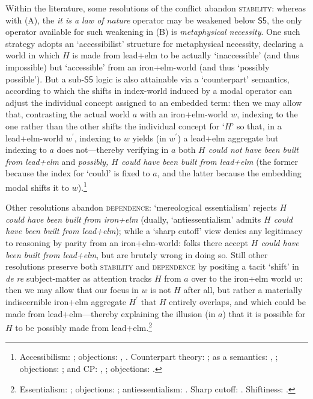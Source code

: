 \documentclass[12pt]{article}
\begin{document}
Within the literature, some resolutions of the conflict abandon
\textsc{stability}: whereas with (A), the \emph{it is a law of nature}
operator may be weakened below $\mathsf{S5}$, the only operator available for
such weakening in (B) is \emph{metaphysical necessity}. One such strategy
adopts an `accessibilist' structure for metaphysical necessity, declaring a
world in which $H$ is made from lead+elm to be actually `inaccessible' (and
thus impossible) but `accessible' from an iron+elm-world (and thus `possibly
possible'). But a sub-$\mathsf{S5}$ logic is also attainable via a
`counterpart' semantics, according to which the shifts in index-world induced
by a modal operator can adjust the individual concept assigned to an embedded
term: then we may allow that, contrasting the actual world $a$ with an
iron+elm-world $w$, indexing to the one rather than the other shifts the
individual concept for `$H$' so that, in a lead+elm-world $w^{\prime}$,
indexing to $w$ yields (in $w^{\prime}$) a lead+elm aggregate but indexing to
$a$ does not---thereby verifying in $a$ both \emph{$H$ could not have been
built from lead+elm} and \emph{possibly, $H$ could have been built from
lead+elm} (the former because the index for `could' is fixed to $a$, and the
latter because the embedding modal shifts it to $w$).\footnote{Accessibilism:
\citep{chandler76,salmon81,salmon89}; objections: \citep[pp.~246--8]{lewis86},
\citep[sec.~8.3]{williamson90}. Counterpart theory:
\citep{lewis68,lewis71cptb,Lewis93cpxap}; as a semantics:
\citep{fara08,fara12}, \citep[sec.~3.2.2]{hmw}; objections:
\citep{Hazen1979-HAZCSF,Woollaston1994-WOOCTA-3,Fara2005-FARCAA,Fara2009-FARDH};
and CP: \citep{forbes84}, \citep[p.~248]{lewis86}; objections:
\citep[sec.~8.3]{williamson90}.}

Other resolutions abandon \textsc{dependence}: `mereological essentialism'
rejects \emph{$H$ could have been built from iron+elm} (dually,
`antiessentialism' admits \emph{$H$ could have been built from lead+elm});
while a `sharp cutoff' view denies any legitimacy to reasoning by parity from
an iron+elm-world: folks there accept \emph{$H$ could have been built from
lead+elm}, but are brutely wrong in doing so.  Still other resolutions
preserve both \textsc{stability} and \textsc{dependence} by positing a tacit
`shift' in \emph{de re} subject-matter as attention tracks $H$ from $a$ over
to the iron+elm world $w$: then we may allow that our focus in $w$ is not $H$
after all, but rather a materially indiscernible iron+elm aggregate
$H^{\prime}$ that $H$ entirely overlaps, and which could be made from
lead+elm---thereby explaining the illusion (in $a$) that it is possible for
$H$ to be possibly made from lead+elm.\footnote{Essentialism:
\citep{chisholm67,Chisholm1973-CHIPAE,Chisholm1975-CHIMES,Zimmerman1992-ZIMAAF,Steen2008-STECCC-2};
objections:
\citep{Plantinga1975-PLAOME,Wiggins1979-WIGME,Kleinschmidt2014-KLEMAL};
antiessentialism: \citep{Mackie2006-MACHTM}. Sharp cutoff:
\citep{williamson90}. Shiftiness:
\citep{Dorr2021-DORTBO-2,Leslie2011-LESEPA,RobertsonIshii2022-ROBEBT,yagisawa}.} 
\end{document}
